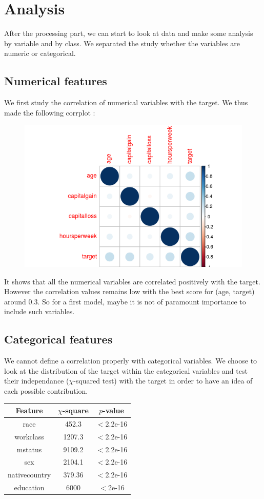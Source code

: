 \documentclass[11pt]{article}
\begin{document}
\section{Analysis}
After the processing part, we can start to look at data and make some analysis by variable and by class. We separated the study whether the variables are numeric or categorical.

\subsection{Numerical features}
We first study the correlation of numerical variables with the target. We thus made the following corrplot :

\begin{figure}[!h]
	\centering
	\includegraphics[width=.6\textwidth]{images/plot_corr.png}
\end{figure}
It shows that all the numerical variables are correlated positively with the target. However the correlation values remains low with the best score for (age, target) around 0.3. So for a first model, maybe it is not of paramount importance to include such variables.

\subsection{Categorical features}
We cannot define a correlation properly with categorical variables. We choose to look at the distribution of the target within the categorical variables and test their independance ($\chi$-squared test) with the target in order to have an idea of each possible contribution.

\begin{center}
\begin{tabular}{|c|c|c|}
\hline
Feature & $\chi$-square & $p$-value \\
\hline
race & 452.3 & $<$2.2e-16\\
workclass & 1207.3 & $<$2.2e-16\\
mstatus & 9109.2 & $<$2.2e-16\\
sex & 2104.1 & $<$2.2e-16\\
nativecountry & 379.36 & $<$2.2e-16 \\
education & 6000 & $<$2e-16\\
\hline
\end{tabular}
\end{center}
\end{document}
